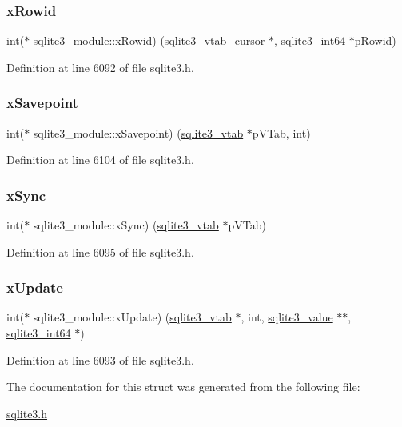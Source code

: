 \subsubsection{\texorpdfstring{x\+Rowid}{xRowid}}
{\footnotesize\ttfamily int($\ast$ sqlite3\+\_\+module\+::x\+Rowid) (\mbox{\hyperlink{structsqlite3__vtab__cursor}{sqlite3\+\_\+vtab\+\_\+cursor}} $\ast$, \mbox{\hyperlink{sqlite3_8h_a0a4d3e6c1ad46f90e746b920ab6ca0d2}{sqlite3\+\_\+int64}} $\ast$p\+Rowid)}



Definition at line 6092 of file sqlite3.\+h.

\mbox{\label{structsqlite3__module_a3819f1935503e558637647c359193ef9}} 
\subsubsection{\texorpdfstring{x\+Savepoint}{xSavepoint}}
{\footnotesize\ttfamily int($\ast$ sqlite3\+\_\+module\+::x\+Savepoint) (\mbox{\hyperlink{structsqlite3__vtab}{sqlite3\+\_\+vtab}} $\ast$p\+V\+Tab, int)}



Definition at line 6104 of file sqlite3.\+h.

\mbox{\label{structsqlite3__module_a3a2dda4b384eef16bf939e3c25df7282}} 
\subsubsection{\texorpdfstring{x\+Sync}{xSync}}
{\footnotesize\ttfamily int($\ast$ sqlite3\+\_\+module\+::x\+Sync) (\mbox{\hyperlink{structsqlite3__vtab}{sqlite3\+\_\+vtab}} $\ast$p\+V\+Tab)}



Definition at line 6095 of file sqlite3.\+h.

\mbox{\label{structsqlite3__module_aa6c44549a07cc5bf36fae44930069ade}} 
\subsubsection{\texorpdfstring{x\+Update}{xUpdate}}
{\footnotesize\ttfamily int($\ast$ sqlite3\+\_\+module\+::x\+Update) (\mbox{\hyperlink{structsqlite3__vtab}{sqlite3\+\_\+vtab}} $\ast$, int, \mbox{\hyperlink{sqlite3_8h_ac2fa1ecdb2290d9af6010edbd1cbc83c}{sqlite3\+\_\+value}} $\ast$$\ast$, \mbox{\hyperlink{sqlite3_8h_a0a4d3e6c1ad46f90e746b920ab6ca0d2}{sqlite3\+\_\+int64}} $\ast$)}



Definition at line 6093 of file sqlite3.\+h.



The documentation for this struct was generated from the following file\+:\begin{DoxyCompactItemize}
\item 
\mbox{\hyperlink{sqlite3_8h}{sqlite3.\+h}}\end{DoxyCompactItemize}
